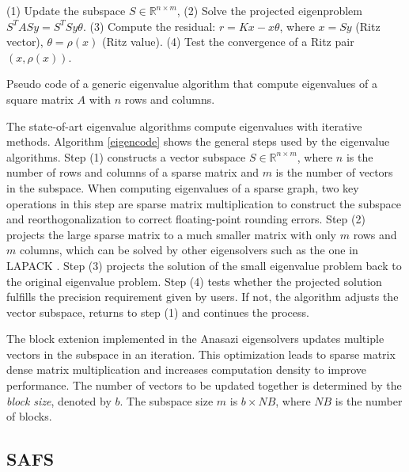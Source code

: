 \begin{algorithm}
	\begin{algorithmic}[1]
		\State (1) Update the subspace $S \in \mathbb{R}^{n \times m}$,
		\State (2) Solve the projected eigenproblem $S^TASy = S^TSy\theta$.
		\State (3) Compute the residual: $r = Kx - x\theta$, where
		\State\hspace{\algorithmicindent} $x = Sy$ (Ritz vector), $\theta = \rho(x)$ (Ritz value).
		\State (4) Test the convergence of a Ritz pair $(x, \rho(x))$.
		\EndFor
	\end{algorithmic}
	\caption{Pseudo code of a generic eigenvalue algorithm that compute eigenvalues
	of a square matrix $A$ with $n$ rows and columns.}
	\label{eigencode}
\end{algorithm}

The state-of-art eigenvalue algorithms compute eigenvalues with iterative
methods. Algorithm \ref{eigencode} shows the general steps used by the eigenvalue
algorithms.
Step (1) constructs a vector subspace $S \in \mathbb{R}^{n \times m}$, where
$n$ is the number of rows and columns of a sparse matrix and $m$ is the number
of vectors in the subspace. When computing eigenvalues of a sparse graph,
two key operations in this step are sparse matrix multiplication to construct
the subspace and reorthogonalization to correct floating-point rounding errors.
Step (2) projects the large sparse matrix to a much smaller matrix with only
$m$ rows and $m$ columns, which can be solved by other eigensolvers such as
the one in LAPACK \cite{lapack}. Step (3) projects the solution of the small
eigenvalue problem back to the original eigenvalue problem. Step (4) tests
whether the projected solution fulfills the precision requirement given by
users. If not, the algorithm adjusts the vector subspace, returns to step (1)
and continues the process.

The block extenion implemented in the Anasazi eigensolvers updates multiple
vectors in the subspace in an iteration. This optimization leads to sparse
matrix dense matrix multiplication and increases computation density to
improve performance. The number of vectors to be updated together is determined
by the \textit{block size}, denoted by $b$. The subspace size $m$
is $b \times NB$, where $NB$ is the number of blocks.

\subsection{SAFS}

